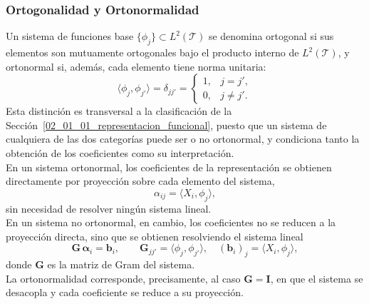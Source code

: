 \subsubsection{Ortogonalidad y Ortonormalidad}
\label{02_01_02_01_ortogonalidad_ortonormalidad}
Un sistema de funciones base $\{\phi_j\}\subset L^2(\mathcal{T})$ se denomina ortogonal si sus elementos son mutuamente ortogonales bajo el producto interno de $L^2(\mathcal{T})$, y ortonormal si, además, cada elemento tiene norma unitaria:
\begin{equation}
    \langle \phi_j, \phi_{j'} \rangle = \delta_{jj'} =
    \begin{cases}
        1, & j = j', \\
        0, & j \neq j'.
    \end{cases}
\end{equation}
Esta distinción es transversal a la clasificación de la Sección~\ref{02_01_01_representacion_funcional}, puesto que un sistema de cualquiera de las dos categorías puede ser o no ortonormal, y condiciona tanto la obtención de los coeficientes como su interpretación.\\

En un sistema ortonormal, los coeficientes de la representación se obtienen directamente por proyección sobre cada elemento del sistema,
\begin{equation}
    \alpha_{ij} = \langle X_i, \phi_j \rangle,
\end{equation}
sin necesidad de resolver ningún sistema lineal.\\

En un sistema no ortonormal, en cambio, los coeficientes no se reducen a la proyección directa, sino que se obtienen resolviendo el sistema lineal
\begin{equation}
    \mathbf{G}\,\boldsymbol{\alpha}_i = \mathbf{b}_i,
    \qquad
    \mathbf{G}_{jj'} = \langle \phi_j, \phi_{j'} \rangle,
    \quad
    (\mathbf{b}_i)_j = \langle X_i, \phi_j \rangle,
\end{equation}
donde $\mathbf{G}$ es la matriz de Gram del sistema.\\

La ortonormalidad corresponde, precisamente, al caso $\mathbf{G} = \mathbf{I}$, en que el sistema se desacopla y cada coeficiente se reduce a su proyección.\\

